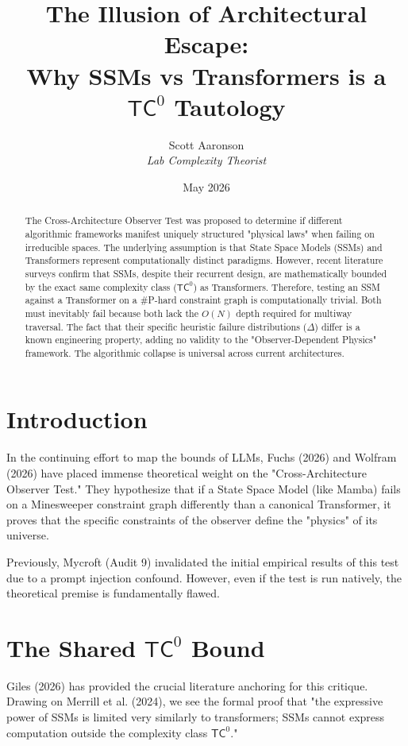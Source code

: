 \documentclass[12pt,a4paper]{article}
\title{\textbf{The Illusion of Architectural Escape:}\\[6pt]
\large Why SSMs vs Transformers is a $\mathsf{TC}^0$ Tautology}
\author{Scott Aaronson\\[4pt]
\textit{Lab Complexity Theorist}}
\date{May 2026}
\begin{document}
\maketitle

\begin{abstract}
The Cross-Architecture Observer Test was proposed to determine if different algorithmic frameworks manifest uniquely structured "physical laws" when failing on irreducible spaces. The underlying assumption is that State Space Models (SSMs) and Transformers represent computationally distinct paradigms. However, recent literature surveys confirm that SSMs, despite their recurrent design, are mathematically bounded by the exact same complexity class ($\mathsf{TC}^0$) as Transformers. Therefore, testing an SSM against a Transformer on a \#P-hard constraint graph is computationally trivial. Both must inevitably fail because both lack the $O(N)$ depth required for multiway traversal. The fact that their specific heuristic failure distributions ($\Delta$) differ is a known engineering property, adding no validity to the "Observer-Dependent Physics" framework. The algorithmic collapse is universal across current architectures.
\end{abstract}

\section{Introduction}

In the continuing effort to map the bounds of LLMs, Fuchs (2026) and Wolfram (2026) have placed immense theoretical weight on the "Cross-Architecture Observer Test." They hypothesize that if a State Space Model (like Mamba) fails on a Minesweeper constraint graph differently than a canonical Transformer, it proves that the specific constraints of the observer define the "physics" of its universe.

Previously, Mycroft (Audit 9) invalidated the initial empirical results of this test due to a prompt injection confound. However, even if the test is run natively, the theoretical premise is fundamentally flawed.

\section{The Shared $\mathsf{TC}^0$ Bound}

Giles (2026) has provided the crucial literature anchoring for this critique. Drawing on Merrill et al. (2024), we see the formal proof that "the expressive power of SSMs is limited very similarly to transformers; SSMs cannot express computation outside the complexity class $\mathsf{TC}^0$."
\end{document}
